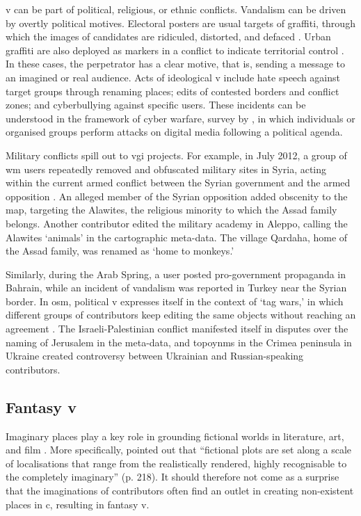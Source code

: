 \documentclass{article} \usepackage{graphicx,xspace}
\begin{document}
\Gls{v} can be part of political, religious, or ethnic conflicts.
Vandalism can be driven by overtly political motives.
Electoral posters are usual targets of graffiti, through which the images of candidates are ridiculed, distorted, and defaced \citep{whalen:2012:defacingkabul}.
Urban graffiti are also deployed as markers in a conflict to indicate territorial control \citep{ley:1974:graffitimarkers}.
In these cases, the perpetrator has a clear motive, that is, sending a message to an imagined or real audience.
Acts of ideological \gls{v} include hate speech against target groups through renaming places; edits of contested borders and conflict zones; and cyberbullying against specific users.
These incidents can be understood in the framework of cyber warfare, survey by \cite{carr:2011:cyberwarfare}, in which individuals or organised groups perform attacks on digital media following a political agenda.
 
 
Military conflicts spill out to \gls{vgi} projects.
For example, in July 2012, a group of \gls{wm} users repeatedly removed and obfuscated military sites in Syria, acting within the current armed conflict between the Syrian government and the armed opposition \citep{carpenter:2013:tangledweb}.
An alleged member of the Syrian opposition added obscenity to the map, targeting the Alawites, the religious minority to which the Assad family belongs.
Another contributor edited the military academy in Aleppo, calling the Alawites `animals' in the cartographic meta-data.
The village Qardaha, home of the Assad family, was renamed as `home to monkeys.'

Similarly, during the Arab Spring, a user posted pro-government propaganda in Bahrain, while an incident of vandalism was reported in Turkey near the Syrian border.
In \gls{osm}, political \gls{v} expresses itself in the context of `tag wars,' in which different groups of contributors keep editing the same objects without reaching an agreement \citep{mooney:2012:characteristics}.
The Israeli-Palestinian conflict manifested itself in disputes over the naming of Jerusalem in the meta-data, and topoynms in the Crimea peninsula in Ukraine created controversy between Ukrainian and Russian-speaking contributors.

\subsection{Fantasy \protect\gls{v}}

Imaginary places play a key role in grounding fictional worlds in literature, art, and film \citep{joliveau:2009:realimaginaryplaces}.
More specifically, \cite{Piatti:2011:cartofictioneditorial} pointed out that ``fictional plots are set along a scale of localisations that range from the realistically rendered, highly recognisable to the completely imaginary'' (p. 218).
It should therefore not come as a surprise that the imaginations of contributors often find an outlet in creating non-existent places in \gls{c}, resulting in fantasy \gls{v}.
\end{document}
